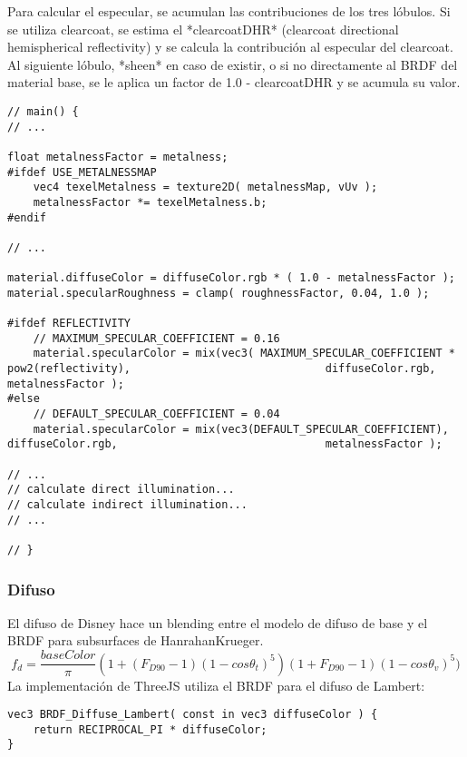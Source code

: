         Para calcular el especular, se acumulan las contribuciones de los tres
        lóbulos. Si se utiliza clearcoat, se estima el *clearcoatDHR*
        (clearcoat directional hemispherical reflectivity) y se calcula la
        contribución al especular del clearcoat. Al siguiente lóbulo, *sheen* en
        caso de existir, o si no directamente al BRDF del material base, se le
        aplica un factor de 1.0 - clearcoatDHR y se acumula su valor.
        \singlespacing
        \begin{lstlisting}[caption=My Javascript Example]
// main() {
// ...

float metalnessFactor = metalness;
#ifdef USE_METALNESSMAP
    vec4 texelMetalness = texture2D( metalnessMap, vUv );
    metalnessFactor *= texelMetalness.b;
#endif

// ...

material.diffuseColor = diffuseColor.rgb * ( 1.0 - metalnessFactor );
material.specularRoughness = clamp( roughnessFactor, 0.04, 1.0 );

#ifdef REFLECTIVITY
    // MAXIMUM_SPECULAR_COEFFICIENT = 0.16
    material.specularColor = mix(vec3( MAXIMUM_SPECULAR_COEFFICIENT * pow2(reflectivity),                              diffuseColor.rgb, metalnessFactor );
#else
    // DEFAULT_SPECULAR_COEFFICIENT = 0.04
    material.specularColor = mix(vec3(DEFAULT_SPECULAR_COEFFICIENT), diffuseColor.rgb,                                metalnessFactor );

// ...
// calculate direct illumination...
// calculate indirect illumination...
// ...
                                    
// }
        \end{lstlisting}

        \subsubsection{Difuso}
            El difuso de Disney hace un blending entre el modelo de difuso de base y el BRDF para
            subsurfaces de HanrahanKrueger.
            $$
            f_d = \frac{baseColor}{\pi}(1 + (F_{D90} - 1) (1 - cos{\theta}_t)^5)(1 + F_{D90} - 1)
            (1 - cos\theta_v)^5)
            $$
            La implementación de ThreeJS utiliza el BRDF para el difuso de Lambert:
            \singlespacing
            \begin{lstlisting}[caption=My Javascript Example]
vec3 BRDF_Diffuse_Lambert( const in vec3 diffuseColor ) {
    return RECIPROCAL_PI * diffuseColor;
}
            \end{lstlisting}

